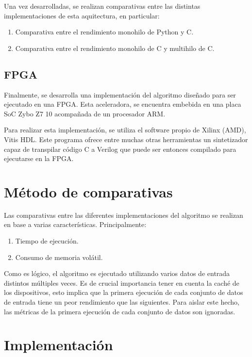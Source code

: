 Una vez desarrolladas,
se realizan comparativas entre las distintas implementaciones
de esta aquitectura, en particular:

\begin{enumerate}[itemsep=0.25px]
    \item Comparativa entre el rendimiento monohilo de Python y C.
    \item Comparativa entre el rendimiento monohilo de C y multihilo de C.
\end{enumerate}

\subsection{FPGA}

Finalmente, se desarrolla una implementación del algoritmo
diseñado para ser ejecutado en una FPGA\@.
Esta aceleradora, se encuentra embebida en una placa SoC
Zybo Z7 10 acompañada de un procesador ARM\@.

Para realizar esta implementación,
se utiliza el software propio de Xilinx (AMD),
Vitis HDL\@.
Este programa ofrece entre muchas otras herramientas
un sintetizador capaz de transpilar código C a Verilog
que puede ser entonces compilado
para ejecutarse en la FPGA\@.

\section{Método de comparativas}

Las comparativas entre las diferentes implementaciones
del algoritmo se realizan en base a varias características.
Principalmente:

\begin{enumerate}[itemsep=0.25px]
    \item Tiempo de ejecución.
    \item Consumo de memoria volátil.
\end{enumerate}

Como es lógico, el algoritmo es ejecutado utilizando
varios datos de entrada distintos múltiples veces.
Es de crucial importancia tener en cuenta la
caché de los dispositivos,
esto implica que la primera ejecución de cada conjunto de datos
de entrada tiene un peor rendimiento que las siguientes.
Para aislar este hecho, las métricas de la
primera ejecución de cada conjunto de datos son ignoradas.

\section{Implementación}

